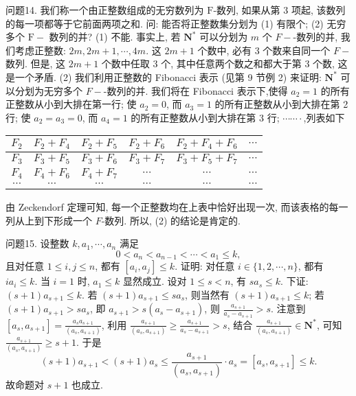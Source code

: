 问题14. 我们称一个由正整数组成的无穷数列为 $\mathrm{F}$-数列, 如果从第 3 项起, 该数列的每一项都等于它前面两项之和.
问: 能否将正整数集分划为
(1) 有限个;
(2) 无穷多个
$\mathrm{F}-$ 数列的并?
(1) 不能.
事实上, 若 $\mathbf{N}^*$ 可以分划为 $m$ 个 $F-$-数列的并, 我们考虑正整数: $2 m, 2 m+1, \cdots, 4 m$. 这 $2 m+1$ 个数中, 必有 3 个数来自同一个 $F-$ 数列.
但是, 这 $2 m+1$ 个数中任取 3 个, 其中任意两个数之和都大于第 3 个数, 这是一个矛盾.
(2) 我们利用正整数的 Fibonacci 表示 (见第 9 节例 2) 来证明: $\mathbf{N}^*$ 可以分划为无穷多个 $F-$-数列的并.
我们将在 Fibonacci 表示下,使得 $a_2=1$ 的所有正整数从小到大排在第一行; 使 $a_2=0$, 而 $a_3=1$ 的所有正整数从小到大排在第 2 行; 使 $a_2=a_3=0$, 而 $a_4=1$ 的所有正整数从小到大排在第 3 行; $\cdots \cdots \cdot$,列表如下
\begin{tabular}{|c|c|c|c|c|c|}
\hline$F_2$ & $F_2+F_4$ & $F_2+F_5$ & $F_2+F_6$ & $F_2+F_4+F_6$ & $\cdots$ \\
\hline$F_3$ & $F_3+F_5$ & $F_3+F_6$ & $F_3+F_7$ & $F_3+F_5+F_7$ & $\cdots$ \\
\hline$F_4$ & $F_4+F_6$ & $F_4+F_7$ & $\cdots$ & $\cdots$ & $\cdots$ \\
\hline$\cdots$ & $\cdots$ & $\cdots$ & $\cdots$ & $\cdots$ & $\cdots$ \\
\hline
\end{tabular}
由 Zeckendorf 定理可知, 每一个正整数均在上表中恰好出现一次, 而该表格的每一列从上到下形成一个 $F$-数列.
所以, (2) 的结论是肯定的.



问题15. 设整数 $k, a_1, \cdots, a_n$ 满足
$$
0<a_n<a_{n-1}<\cdots<a_1 \leqslant k,
$$
且对任意 $1 \leqslant i, j \leqslant n$, 都有 $\left[a_i, a_j\right] \leqslant k$.
证明: 对任意 $i \in\{1,2, \cdots, n\}$, 都有 $i a_i \leqslant k$.
当 $i=1$ 时, $a_1 \leqslant k$ 显然成立.
设对 $1 \leqslant s<n$, 有 $s a_s \leqslant k$. 下证: $(s+1) a_{s+1} \leqslant k$.
若 $(s+1) a_{s+1} \leqslant s a_s$, 则当然有 $(s+1) a_{s+1} \leqslant k$; 若 $(s+1) a_{s+1}>s a_s$, 即 $a_{s+1}> s\left(a_s-a_{s+1}\right)$, 则 $\frac{a_{s+1}}{a_s-a_{s+1}}>s$.
注意到 $\left[a_s, a_{s+1}\right]=\frac{a_s a_{s+1}}{\left(a_s, a_{s+1}\right)}$, 利用 $\frac{a_{s+1}}{\left(a_s, a_{s+1}\right)} \geqslant \frac{a_{s+1}}{a_s-a_{s+1}}>s$, 结合 $\frac{a_{s+1}}{\left(a_s, a_{s+1}\right)} \in \mathbf{N}^*$, 可知 $\frac{a_{s+1}}{\left(a_s, a_{s+1}\right)} \geqslant s+1$. 于是
$$
(s+1) a_{s+1}<(s+1) a_s \leqslant \frac{a_{s+1}}{\left(a_s, a_{s+1}\right)} \cdot a_s=\left[a_s, a_{s+1}\right] \leqslant k .
$$
故命题对 $s+1$ 也成立.



